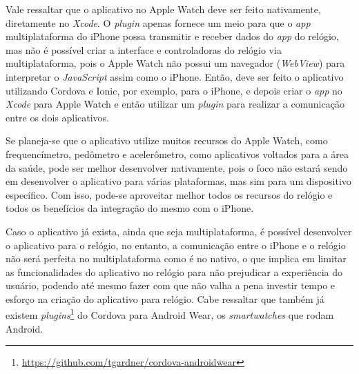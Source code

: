 Vale ressaltar que o aplicativo no Apple Watch deve ser feito nativamente, diretamente no \textit{Xcode}. O \textit{plugin} apenas fornece um meio para que o \textit{app} multiplataforma do iPhone possa transmitir e receber 
dados do \textit{app} do relógio, mas não é possível criar a interface e controladoras do relógio via multiplataforma, pois o Apple Watch não possui um navegador (\textit{WebView}) para interpretar o \textit{JavaScript} assim 
como o iPhone. Então, deve ser feito o aplicativo utilizando Cordova e Ionic, por exemplo, para o iPhone, e depois criar o \textit{app} no \textit{Xcode} para Apple Watch e então utilizar um \textit{plugin} para realizar a 
comunicação entre os dois aplicativos.  

Se planeja-se que o aplicativo utilize muitos recursos do Apple Watch, como frequencímetro, pedômetro e acelerômetro, como aplicativos voltados para a área da saúde, pode ser melhor desenvolver nativamente,
pois o foco não estará sendo em desenvolver o aplicativo para várias plataformas, mas sim para um dispositivo específico. Com isso, pode-se aproveitar melhor todos os recursos do relógio e todos os benefícios da integração
do mesmo com o iPhone.

Caso o aplicativo já exista, ainda que seja multiplataforma, é possível desenvolver o aplicativo para o relógio, no entanto, a comunicação entre o iPhone e o relógio não será perfeita no multiplataforma como é no nativo, 
o que implica em limitar as funcionalidades do aplicativo no relógio para não prejudicar a experiência do usuário, podendo até mesmo fazer com que não valha a pena investir tempo e esforço na criação do aplicativo para
relógio. Cabe ressaltar que também já existem \textit{plugins}\footnote{\url{https://github.com/tgardner/cordova-androidwear}} do Cordova para Android Wear, os \textit{smartwatches} que rodam Android.

